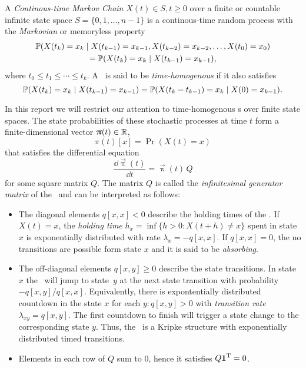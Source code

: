 \begin{dfn}
  A \emph{Continous-time Markov Chain} \paren{\CTMC}
  $X(t) \in S, t \ge 0$ over a finite or countable infinite state
  space $S = \{0, 1, \ldots, n - 1\}$ is a continous-time random
  process with the \emph{Markovian} or memoryless property
  \begin{multline}\allowdisplaybreaks[0]
    \Pr(X(t_k) = x_k \mid X(t_{k - 1}) = x_{k - 1}, X(t_{k -
      2}) = x_{k - 2}, \ldots, X(t_{0}) = x_{0}) \\
    = \Pr(X(t_k) = x_k \mid X(t_{k - 1}) = x_{k - 1}) \text,
  \end{multline}
  where $t_0 \le t_1 \le \cdots \le t_k$. A \CTMC\ is said to be
  \emph{time-homogenous} if it also satisfies
  \begin{equation}
    \Pr(X(t_k) = x_k \mid X(t_{k - 1}) = x_{k - 1}) = \Pr(X(t_k - t_{k -
      1}) = x_k \mid X(0) = x_{k - 1}) \text.
  \end{equation}
\end{dfn}

In this report we will restrict our attention to time-homogenous \CTMC
s over finite state spaces. The state probabilities of these
stochastic processes at time $t$ form a finite-dimensional vector
$\vec{\uppi}(t) \in \RR$,
\begin{equation}
  \pi(t)[x] = \Pr(X(t) = x)
\end{equation}
that satisfies the differential equation
\begin{equation}
  \label{eq:background:ctmc:diffeq}
  \frac{\dd \vec{\uppi}(t)}{\dd t} = \vec{\uppi}(t) \, Q
\end{equation}
for some square matrix $Q$. The matrix $Q$ is called the
\emph{infinitesimal generator matrix} of the \CTMC\ and can be
interpreted as follows:
\begin{itemize}
\item The diagonal elements $q[x, x] < 0$ describe the holding times
  of the \CTMC. If $X(t) = x$, the \emph{holding time}
  $h_x = \inf \{ h > 0 : X(t + h) \ne x \}$ spent in state $x$ is
  exponentially distributed with rate $\lambda_x = -q[x, x]$. If $q[x,
  x] = 0$, the no transitions are possible form state $x$ and it is
  said to be \emph{absorbing}.
\item The off-diagonal elements $q[x, y] \ge 0$ describe the state
  transitions. In state~$x$ the \CTMC\ will jump to state~$y$ at the
  next state transition with probability $-q[x, y] / q[x, x]$.
  Equivalently, there is expontentially distributed countdown in the
  state $x$ for each $y : q[x, y] > 0$ with \emph{transition rate}
  $\lambda_{xy} = q[x, y]$. The first countdown to finish will trigger
  a state change to the corresponding state $y$. Thus, the \CTMC\ is a
  Kripke structure with exponentially distributed timed transitions.
\item Elements in each row of $Q$ sum to $0$, hence it satisfies
  $Q \vec{1}^\T = 0$.
\end{itemize}

